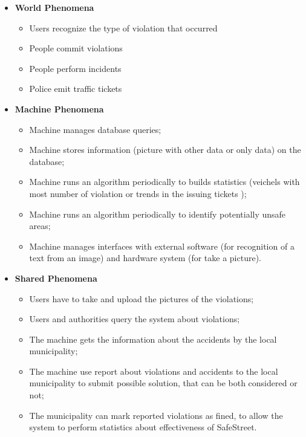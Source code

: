 \documentclass[../RASD.tex]{subfiles}
\begin{document}
    \begin{itemize}
        \item \textbf{World Phenomena}
        \begin{itemize}
            \item Users recognize the type of violation that occurred
            \item People commit violations
            \item People perform incidents
            \item Police emit traffic tickets
        \end{itemize}
        \item \textbf{Machine Phenomena}
        \begin{itemize}
            \item Machine manages database queries;
            \item Machine stores information (picture with other data or only data) on the database;
            \item Machine runs an algorithm periodically to builds statistics (veichels with most number of violation or trends in the issuing tickets );
            \item Machine runs an algorithm periodically to identify potentially unsafe areas;
            \item Machine manages interfaces with external software (for recognition of a text from an image) and hardware system (for take a picture).
        \end{itemize}
        \item \textbf{Shared Phenomena}
        \begin{itemize}
            \item Users have to take and upload the pictures of the violations;
            \item Users and authorities query the system about violations;
            \item The machine gets the information about the accidents by the local municipality;
            \item The machine use report about violations and accidents to the local municipality to submit possible solution, that can be both considered or not;
            \item The municipality can mark reported violations as fined, to allow the system to perform statistics about effectiveness of SafeStreet.
        \end{itemize}
    \end{itemize}
\end{document}
